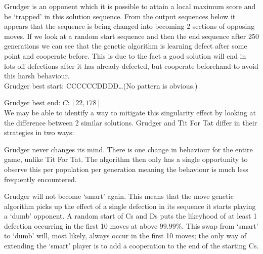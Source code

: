 Grudger is an opponent which it is possible to attain a local maximum score and be `trapped' in this solution sequence.
From the output sequences below it appears that the sequence is being changed into becoming 2 sections of opposing moves.
If we look at a random start sequence and then the end sequence after 250 generations we can see that the genetic algorithm is learning defect after some point and cooperate before.
This is due to the fact a good solution will end in lots off defections after it has already defected, but cooperate beforehand to avoid this harsh behaviour.\\

Grudger best start: CCCCCCDDDD\ldots (No pattern is obvious.)

Grudger best end: \(C:[22,178]\)\\

We may be able to identify a way to mitigate this singularity effect by looking at the difference between 2 similar solutions.
Grudger and Tit For Tat differ in their strategies in two ways:

\begin{itemize}
    \begin{item}
    Grudger never changes its mind.
    There is one change in behaviour for the entire game, unlike Tit For Tat.
    The algorithm then only has a single opportunity to observe this per population     per generation meaning the behaviour is much less frequently encountered.
    \end{item}
\begin{item}
    Grudger will not become `smart' again.
    This means that the move genetic algorithm picks up the effect of a single  defection in its sequence it starts playing a `dumb' opponent.
    A random start of Cs and Ds puts the likeyhood of at least 1 defection occurring in the first 10 moves at above \(99.99\% \).
    This swap from `smart' to `dumb' will, most likely, always occur in the first 10 moves;
    the only way of extending the `smart' player is to add a cooperation to the end of the starting Cs.
\end{item}
\end{itemize}

